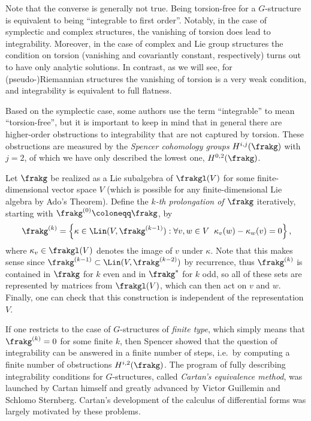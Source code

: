 \begin{rem}
    Note that the converse is generally not true. Being torsion-free for a $G$-structure is equivalent to being ``integrable to first order''. Notably, in the case of symplectic and complex structures, the vanishing of torsion does lead to integrability. Moreover, in the case of complex and Lie group structures the condition on torsion (vanishing and covariantly constant, respectively) turns out to have only analytic solutions. In contrast, as we will see, for (pseudo-)Riemannian structures the vanishing of torsion is a very weak condition, and integrability is equivalent to full flatness. 
    
    Based on the symplectic case, some authors use the term ``integrable'' to mean ``torsion-free'', but it is important to keep in mind that in general there are higher-order obstructions to integrability that are not captured by torsion. These obstructions are measured by the \emph{Spencer cohomology groups} $H^{i,j}(\frakg)$ with $j=2$, of which we have only described the lowest one, $H^{0,2}(\frakg)$. 

    Let $\frakg$ be realized as a Lie subalgebra of $\frakgl(V)$ for some finite-dimensional vector space $V$ (which is possible for any finite-dimensional Lie algebra by Ado's Theorem). Define the \emph{$k$-th prolongation of $\frakg$} iteratively, starting with $\frakg^{(0)}\coloneqq \frakg$, by
    \[\frakg^{(k)}=\left\{\kappa \in\Lin(V,\frakg^{(k-1)}):\forall v,w\in V\;\; \kappa_v(w)-\kappa_w(v)=0\right\},\]
    where $\kappa_v\in\frakgl(V)$ denotes the image of $v$ under $\kappa$. Note that this makes sense since $\frakg^{(k-1)}\subset \Lin(V,\frakg^{(k-2)})$ by recurrence, thus $\frakg^{(k)}$ is contained in $\frakg$ for $k$ even and in $\frakg^\ast$ for $k$ odd, so all of these sets are represented by matrices from $\frakgl(V)$, which can then act on $v$ and $w$. Finally, one can check that this construction is independent of the representation $V$.
    
    If one restricts to the case of $G$-structures of \emph{finite type}, which simply means that $\frakg^{(k)}=0$ for some finite $k$, then Spencer showed that the question of integrability can be answered in a finite number of steps, i.e.\ by computing a finite number of obstructions $H^{i,2}(\frakg)$. The program of fully describing integrability conditions for $G$-structures, called \emph{Cartan's equivalence method}, was launched by Cartan himself and greatly advanced by Victor Guillemin and Schlomo Sternberg. Cartan's development of the calculus of differential forms was largely motivated by these problems.
\end{rem}

